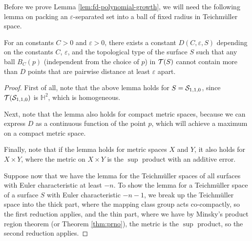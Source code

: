 \documentclass[12pt, reqno]{amsart}
\begin{document}
Before we prove Lemma \ref{lem:fd-polynomial-growth}, we will need the following lemma on packing an $\varepsilon$-separated set into a ball of fixed radius in Teichmüller space.

\begin{lemma}
  \label{lem:packing-argument}
  For an constants $C > 0$ and $\varepsilon > 0$, there exists a constant $D(C, \varepsilon, S)$ depending on the constants $C$, $\varepsilon$, and the topological type of the surface $S$ such that any ball $B_C(p)$ (independent from the choice of $p$) in $\mathcal{T}(S)$ cannot contain more than $D$ points that are pairwise distance at least $\varepsilon$ apart.
\end{lemma}

\begin{proof}
  First of all, note that the above lemma holds for $S = \mathcal{S}_{1,1,0}$, since $\mathcal{T}(\mathcal{S}_{1,1,0})$ is $\mathbb{H}^2$, which is homogeneous.

  Next, note that the lemma also holds for compact metric spaces, because we can express $D$ as a continuous function of the point $p$, which will achieve a maximum on a compact metric space.

  Finally, note that if the lemma holds for metric spaces $X$ and $Y$, it also holds for $X \times Y$, where the metric on $X \times Y$ is the $\sup$ product with an additive error.

  Suppose now that we have the lemma for the Teichmüller spaces of all surfaces with Euler characteristic at least $-n$.
  To show the lemma for a Teichmüller space of a surface $S$ with Euler characteristic $-n-1$, we break up the Teichmüller space into the thick part, where the mapping class group acts co-compactly, so the first reduction applies, and the thin part, where we have by Minsky's product region theorem \cite[Theorem 6.1]{1077244446} (or Theorem \ref{thm:prno}), the metric is the $\sup$ product, so the second reduction applies.
\end{proof}
\end{document}
